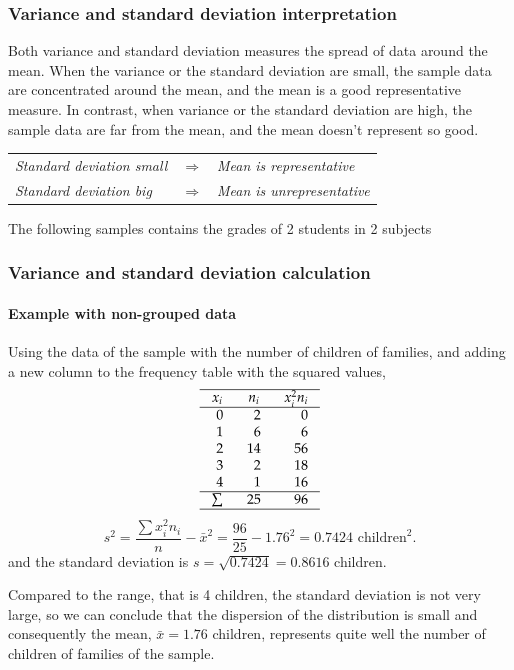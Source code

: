 \begin{frame}
\frametitle{Variance and standard deviation interpretation}
Both variance and standard deviation measures the spread of data around the mean. 
When the variance or the standard deviation are small, the sample data are concentrated around the mean, and the mean is
a good representative measure. 
In contrast, when variance or the standard deviation are high, the sample data are far from the mean, and the mean
doesn't represent so good. 
\begin{center}
\begin{tabular}{lcl}
\emph{Standard deviation small} & $\Rightarrow$ & \emph{Mean is representative}\\
\emph{Standard deviation big} & $\Rightarrow$ & \emph{Mean is unrepresentative}\\
\end{tabular}
\end{center}

 The following samples contains the grades of 2 students in 2 subjects 
\begin{center}
\scalebox{1}{}

\end{center}
\end{frame}


\begin{frame}
\frametitle{Variance and standard deviation calculation}
\framesubtitle{Example with non-grouped data}
Using the data of the sample with the number of children of families, and adding a new column to the frequency table
with the squared values, 
\[
\setlength\arraycolsep{3mm}
\setlength\arrayrulewidth{0.5pt}
\begin{array}{rrr}
\hline
\multicolumn{1}{c}{x_i} & \multicolumn{1}{c}{n_i} & \multicolumn{1}{c}{x_i^2n_i} \\
\hline
0 & 2 & 0 \\
1 & 6 & 6 \\
2 & 14 & 56\\
3 & 2  & 18\\
4 & 1 & 16 \\
\hline
\sum & 25 & 96 \\
\hline
\end{array}
\]
\[
s^2 = \frac{\sum x_i^2n_i}{n}-\bar x^2 = \frac{96}{25}-1.76^2= 0.7424 \mbox{ children}^2.
\]
and the standard deviation is $s=\sqrt{0.7424} = 0.8616$ children.

Compared to the range, that is 4 children, the standard deviation is not very large, so we can conclude
that the dispersion of the distribution is small and consequently the mean, $\bar x=1.76$ children, represents quite
well the number of children of families of the sample. 
\end{frame}


